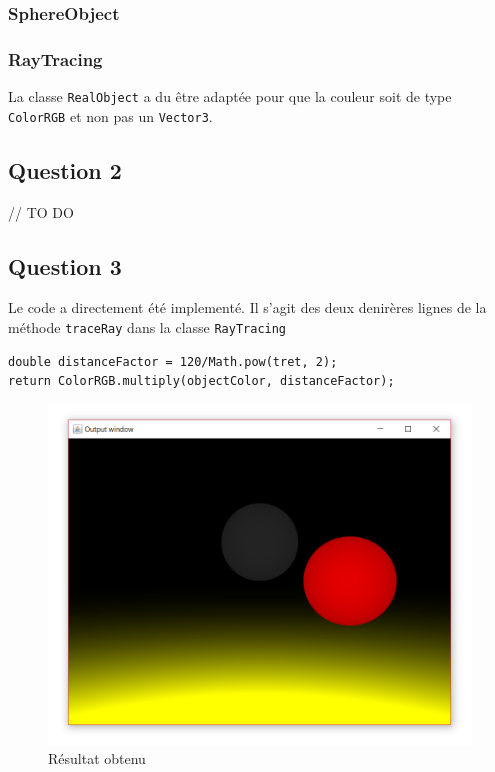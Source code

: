\subsubsection{SphereObject}

\subsubsection{RayTracing}

La classe \texttt{RealObject} a du être adaptée pour que la couleur soit de type \texttt{ColorRGB} et non pas un \texttt{Vector3}.



\subsection{Question 2}

// TO DO

\subsection{Question 3}

Le code a directement été implementé. Il s'agit des deux denirères lignes de la méthode \texttt{traceRay} dans la classe \texttt{RayTracing}

\begin{lstlisting}
double distanceFactor = 120/Math.pow(tret, 2);
return ColorRGB.multiply(objectColor, distanceFactor);
\end{lstlisting}

\begin{figure}[H]
	\caption{\label{9_resultat} Résultat obtenu}
	\centering
	\includegraphics[scale = 0.4]{Figures/9_resultat.png}
\end{figure}